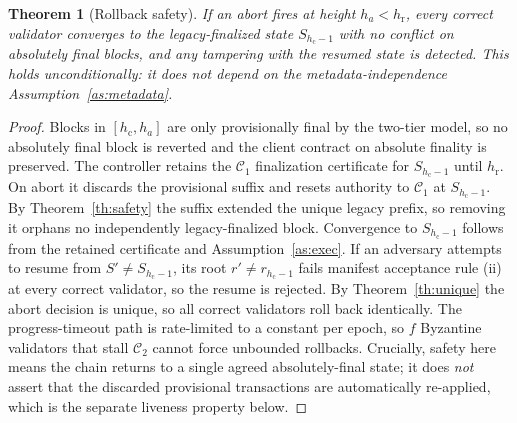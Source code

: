 \documentclass[journal]{IEEEtran}
\newtheorem{theorem}{Theorem}
\theoremstyle{definition}
\theoremstyle{remark}
\begin{document}
\begin{theorem}[Rollback safety]
\label{th:rollback}
If an abort fires at height $h_a<h_{\mathrm{r}}$, every correct validator converges to the
legacy-finalized state $S_{h_{\mathrm{c}}-1}$ with no conflict on absolutely final blocks, and
any tampering with the resumed state is detected. This holds \emph{unconditionally}: it does
not depend on the metadata-independence Assumption~\ref{as:metadata}.
\end{theorem}
\begin{proof}
Blocks in $[h_{\mathrm{c}},h_a]$ are only provisionally final by the two-tier model, so no
absolutely final block is reverted and the client contract on absolute finality is preserved.
The controller retains the $\mathcal{C}_1$ finalization certificate for $S_{h_{\mathrm{c}}-1}$
until $h_{\mathrm{r}}$. On abort it discards the provisional suffix and resets authority to
$\mathcal{C}_1$ at $S_{h_{\mathrm{c}}-1}$. By Theorem~\ref{th:safety} the suffix extended the
unique legacy prefix, so removing it orphans no independently legacy-finalized block.
Convergence to $S_{h_{\mathrm{c}}-1}$ follows from the retained certificate and
Assumption~\ref{as:exec}. If an adversary attempts to resume from $S'\ne S_{h_{\mathrm{c}}-1}$, its root
$r'\ne r_{h_{\mathrm{c}}-1}$ fails manifest acceptance rule (ii) at every correct validator, so
the resume is rejected. By Theorem~\ref{th:unique} the abort decision is unique, so all correct
validators roll back identically. The progress-timeout path is rate-limited to a constant per
epoch, so $f$ Byzantine validators that stall $\mathcal{C}_2$ cannot force unbounded rollbacks.
Crucially, safety here means the chain returns to a single agreed absolutely-final state; it
does \emph{not} assert that the discarded provisional transactions are automatically re-applied,
which is the separate liveness property below.
\end{proof}
\end{document}
